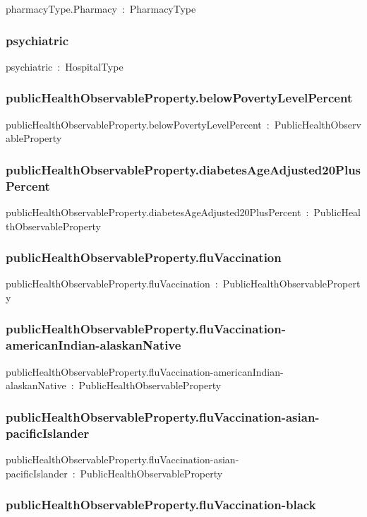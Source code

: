 \documentclass{article}
\begin{document}
pharmacyType.Pharmacy~:~PharmacyType

\subsubsection*{psychiatric}

psychiatric~:~HospitalType

\subsubsection*{publicHealthObservableProperty.belowPovertyLevelPercent}

publicHealthObservableProperty.belowPovertyLevelPercent~:~PublicHealthObservableProperty

\subsubsection*{publicHealthObservableProperty.diabetesAgeAdjusted20PlusPercent}

publicHealthObservableProperty.diabetesAgeAdjusted20PlusPercent~:~PublicHealthObservableProperty

\subsubsection*{publicHealthObservableProperty.fluVaccination}

publicHealthObservableProperty.fluVaccination~:~PublicHealthObservableProperty

\subsubsection*{publicHealthObservableProperty.fluVaccination-americanIndian-alaskanNative}

publicHealthObservableProperty.fluVaccination-americanIndian-alaskanNative~:~PublicHealthObservableProperty

\subsubsection*{publicHealthObservableProperty.fluVaccination-asian-pacificIslander}

publicHealthObservableProperty.fluVaccination-asian-pacificIslander~:~PublicHealthObservableProperty

\subsubsection*{publicHealthObservableProperty.fluVaccination-black}
\end{document}
